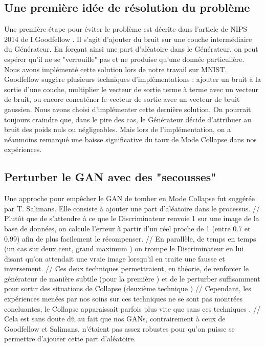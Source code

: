 	\subsection{Une première idée de résolution du problème}
		Une première étape pour éviter le problème est décrite dans l'article de NIPS 2014 de I.Goodfellow \cite{goodfellow_generative_2014}. Il s'agit d'ajouter du bruit sur une couche intermédiaire du Générateur. En forçant ainsi une part d'aléatoire dans le Générateur, on peut espérer qu'il ne se "verrouille" pas et ne produise qu'une donnée particulière. 
		Nous avons implémenté cette solution lors de notre travail sur MNIST. Goodfellow suggère plusieurs techniques d'implémentations : ajouter un bruit à la sortie d'une couche, multiplier le vecteur de sortie terme à terme avec un vecteur de bruit, ou encore concaténer le vecteur de sortie avec un vecteur de bruit gaussien. Nous avons choisi d'implémenter cette dernière solution. On pourrait toujours craindre que, dans le pire des cas, le Générateur décide d'attribuer au bruit des poids nuls ou négligeables. Mais lors de l'implémentation, on a néanmoins remarqué une baisse significative du taux de Mode Collapse dans nos expériences.
		\subsection{Perturber le GAN avec des "secousses" } 
		Une approche pour empêcher le GAN de tomber en Mode Collapse fut suggérée par T. Salimans. Elle consiste à ajouter une part d'aléatoire dans le processus. //
	Plutôt que de s'attendre à ce que le Discriminateur renvoie 1 sur une image de la base de données, on calcule l'erreur à partir d'un réel proche de 1 (entre 0.7 et 0.99) afin de plus facilement le récompenser. //
	En parallèle, de temps en temps (un cas sur deux cent, grand maximum ) on trompe le Discriminateur en lui disant qu'on attendait une vraie image lorsqu'il en traite une fausse et inversement. //
	Ces deux techniques permettraient, en théorie, de renforcer le générateur de manière subtile (pour la première ) et de le perturber suffisamment pour sortir des situations de Collapse (deuxième technique ) //
	Cependant, les expériences menées par nos soins sur ces techniques ne se sont pas montrées concluantes, le Collapse apparaissait parfois plus vite que sans ces techniques . //
	Cela est sans doute dû au fait que nos GANs, contrairement à ceux de Goodfellow et Salimans, n'étaient pas assez robustes pour qu'on puisse se permettre d'ajouter cette part d'aléatoire. 
	
